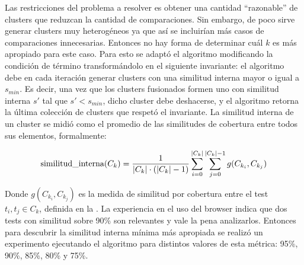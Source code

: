 
\par Las restricciones del problema a resolver es obtener una cantidad ``razonable'' de clusters que reduzcan la cantidad de comparaciones. Sin embargo, de poco sirve generar clusters muy heterogéneos ya que así se incluirían más casos de comparaciones innecesarias. Entonces no hay forma de determinar cuál $k$ es más apropiado para este caso. Para esto se adaptó el algoritmo modificando la condición de término transformándolo en el siguiente invariante: el algoritmo debe en cada iteración generar clusters con una similitud interna mayor o igual a $s_{min}$. Es decir, una vez que los clusters fusionados formen uno con similitud interna $s'$ tal que $s' < s_{min}$, dicho cluster debe deshacerse, y el algoritmo retorna la última colección de clusters que respetó el invariante. La similitud interna de un cluster se midió como el promedio de las similitudes de cobertura entre todos sus elementos, formalmente:

\[ \textrm{similitud\_interna}(C_k) = \dfrac{1}{\vert C_k \vert\cdot(\vert C_k \vert-1)} \sum_{i=0}^{\vert C_k \vert} \sum_{j=0}^{\vert C_k \vert - 1} g(C_{k_i},C_{k_j} )\]

\par Donde $g(C_{k_i},C_{k_j})$ es la medida de similitud por cobertura entre el test $t_i, t_j \in C_{k}$, definida en la . La experiencia en el uso del browser indica que dos tests con similitud sobre 90\% son relevantes y vale la pena analizarlos. Entonces para descubrir la similitud interna mínima más apropiada se realizó un experimento ejecutando el algoritmo para distintos valores de esta métrica: 95\%, 90\%, 85\%, 80\% y 75\%. 


